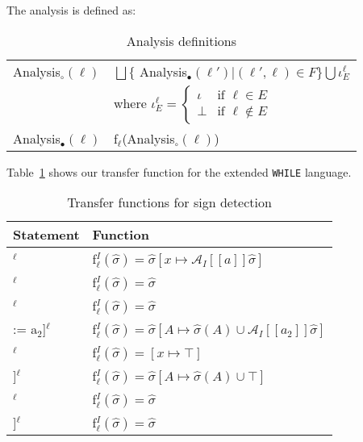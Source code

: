 \noindent The analysis is defined as:
\begin{table}[H]
\begin{tabular}{| l | l |}
  \hline
  Analysis$_\circ(\ell)$ & $ \bigsqcup \{$ Analysis$_\bullet (\ell') | (\ell', \ell) \in F \} \bigcup \iota_E^{\ell} $ \\
                         & where $\iota_E^{\ell} = \begin{cases} \iota & \text{if } \ell \in E \\ 
                                                                 \bot  & \text{if } \ell \notin E
                                                   \end{cases}$\\
  \hline
  Analysis$_\bullet(\ell)$ & f$_\ell$(Analysis$_\circ(\ell)$)\\
  \hline
\end{tabular}
\centering
\caption{Analysis definitions}
\end{table}


Table~\ref{table:interval_analysis_functions} shows our transfer function for the extended \texttt{WHILE} language.
\begin{table}[h]
\begin{tabular}{| l | l |}
  \hline
  Statement & Function \\
  \hline
  \hline
  [x := a]$^\ell$ & f$_\ell^I (\widehat{\sigma}) = \widehat{\sigma}[x \mapsto \mathcal{A}_I[\![a]\!] \widehat{\sigma} ]$ \\
  \hline
 [skip]$^\ell$ & f$_\ell^I (\widehat{\sigma}) = \widehat{\sigma}$\\
  \hline
 [b]$^\ell$ & f$_\ell^I (\widehat{\sigma}) = \widehat{\sigma}$\\
  \hline
  [A[a$_1$] := a$_2$]$^\ell$ & f$_\ell^I (\widehat{\sigma}) = \widehat{\sigma}[A\mapsto \widehat{\sigma}(A)\cup \mathcal{A}_I[\![a_2]\!] \widehat{\sigma}]$\\
  \hline
  [read x]$^\ell$ & f$_\ell^I (\widehat{\sigma}) = [x \mapsto \top]$ \\
  \hline
  [read A[a]]$^\ell$ & f$_\ell^I (\widehat{\sigma}) =  \widehat{\sigma}[A\mapsto \widehat{\sigma}(A)\cup \top]$\\
  \hline
  [write x]$^\ell$ & f$_\ell^I (\widehat{\sigma}) = \widehat{\sigma}$\\
  \hline
  [write A[n]]$^\ell$ & f$_\ell^I (\widehat{\sigma}) = \widehat{\sigma}$\\
  \hline
\end{tabular}
\centering
\caption{Transfer functions for sign detection}
\label{table:interval_analysis_functions}
\end{table}


